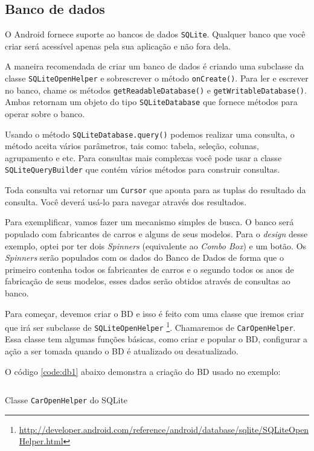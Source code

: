 \documentclass[a4paper,12pt,brazil]{book}
\begin{document}
\begin{singlespace}
		\section{Banco de dados}

		O Android fornece suporte ao bancos de dados \texttt{SQLite}. Qualquer banco que você criar será acessível apenas pela sua aplicação e não fora dela.

		A maneira recomendada de criar um banco de dados é criando uma subclasse da classe \texttt{SQLiteOpenHelper} e sobrescrever o método \texttt{onCreate()}. Para ler e escrever no banco, chame os métodos \texttt{getReadableDatabase()} e \texttt{getWritableDatabase()}. Ambas retornam um objeto do tipo \texttt{SQLiteDatabase} que fornece métodos para operar sobre o banco.

		Usando o método \texttt{SQLiteDatabase.query()}  podemos realizar uma consulta, o método aceita vários parâmetros, tais como: tabela, seleção, colunas, agrupamento e etc. Para consultas mais complexas você pode usar a classe \texttt{SQLiteQueryBuilder} que contém vários métodos para construir consultas.

		Toda consulta vai retornar um \texttt{Cursor} que aponta para as tuplas do resultado da consulta. Você deverá usá-lo para navegar através dos resultados.

		Para exemplificar, vamos fazer um mecanismo simples de busca. O banco será populado com fabricantes de carros e alguns de seus modelos. Para o \emph{design} desse exemplo, optei por ter dois \emph{Spinners} (equivalente ao \emph{Combo Box}) e um botão. Os \emph{Spinners} serão populados com os dados do Banco de Dados de forma que o primeiro contenha todos os fabricantes de carros e o segundo todos os anos de fabricação de seus modelos, esses dados serão obtidos através de consultas ao banco.

		Para começar, devemos  criar o BD e isso é feito com uma classe que iremos criar que irá ser subclasse de \texttt{SQLiteOpenHelper}
\footnote{\href{http://developer.android.com/reference/android/database/sqlite/SQLiteOpenHelper.html}{http://developer.android.com/reference/android/database/sqlite/SQLiteOpenHelper.html}}.
 Chamaremos de \texttt{CarOpenHelper}. Essa classe tem algumas funções básicas, como criar e popular o BD, configurar a ação a ser tomada quando o BD é atualizado ou desatualizado.

		O código \ref	{code:db1} abaixo demonstra a criação do BD usado no exemplo:

		\begin{listing}[H]
		\inputminted[linenos=true,fontsize=\small,frame=lines, framesep=2mm, tabsize=2,numbersep=5pt]{java}{src/api/storage/db1.java}
		\caption{Classe \texttt{CarOpenHelper} do SQLite}
		\label{code:db1}
		\end{listing} 	


\end{singlespace}
\end{document}
